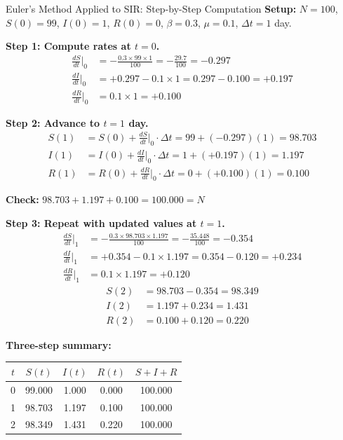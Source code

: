 \begin{examplebox}{Euler's Method Applied to SIR: Step-by-Step Computation}
\textbf{Setup:} $N = 100$, $S(0) = 99$, $I(0) = 1$, $R(0) = 0$, $\beta = 0.3$, $\mu = 0.1$, $\Delta t = 1$ day.

\medskip
\textbf{Step 1: Compute rates at $t = 0$.}
\begin{align*}
    \frac{dS}{dt}\bigg|_0 &= -\frac{0.3 \times 99 \times 1}{100} = -\frac{29.7}{100} = -0.297 \\[4pt]
    \frac{dI}{dt}\bigg|_0 &= +0.297 - 0.1 \times 1 = 0.297 - 0.100 = +0.197 \\[4pt]
    \frac{dR}{dt}\bigg|_0 &= 0.1 \times 1 = +0.100
\end{align*}

\medskip
\textbf{Step 2: Advance to $t = 1$ day.}
\begin{align*}
    S(1) &= S(0) + \frac{dS}{dt}\big|_0 \cdot \Delta t = 99 + (-0.297)(1) = 98.703 \\
    I(1) &= I(0) + \frac{dI}{dt}\big|_0 \cdot \Delta t = 1 + (+0.197)(1) = 1.197 \\
    R(1) &= R(0) + \frac{dR}{dt}\big|_0 \cdot \Delta t = 0 + (+0.100)(1) = 0.100
\end{align*}

\textbf{Check:} $98.703 + 1.197 + 0.100 = 100.000 = N$ \checkmark

\medskip
\textbf{Step 3: Repeat with updated values at $t = 1$.}
\begin{align*}
    \frac{dS}{dt}\bigg|_1 &= -\frac{0.3 \times 98.703 \times 1.197}{100} = -\frac{35.448}{100} = -0.354 \\[4pt]
    \frac{dI}{dt}\bigg|_1 &= +0.354 - 0.1 \times 1.197 = 0.354 - 0.120 = +0.234 \\[4pt]
    \frac{dR}{dt}\bigg|_1 &= 0.1 \times 1.197 = +0.120
\end{align*}
\begin{align*}
    S(2) &= 98.703 - 0.354 = 98.349 \\
    I(2) &= 1.197 + 0.234 = 1.431 \\
    R(2) &= 0.100 + 0.120 = 0.220
\end{align*}

\medskip
\textbf{Three-step summary:}
\begin{center}
\begin{tabular}{ccccc}
\toprule
$t$ & $S(t)$ & $I(t)$ & $R(t)$ & $S+I+R$ \\
\midrule
0 & 99.000 & 1.000 & 0.000 & 100.000 \\
1 & 98.703 & 1.197 & 0.100 & 100.000 \\
2 & 98.349 & 1.431 & 0.220 & 100.000 \\
\bottomrule
\end{tabular}
\end{center}


\end{examplebox}
